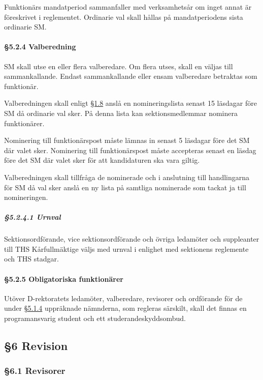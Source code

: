Funktionärs mandatperiod sammanfaller med verksamhetsår om inget annat är föreskrivet i reglementet. Ordinarie val skall hållas på mandatperiodens sista ordinarie SM.

\paragraph{§5.2.4 Valberedning}

SM skall utse en eller flera valberedare. Om flera utses, skall en väljas till
sammankallande. Endast sammankallande eller ensam valberedare betraktas som funktionär.

Valberedningen skall enligt \href{#officiella_informationskanaler}{§1.8} anslå en nomineringslista senast 15 läsdagar före SM då ordinarie val sker. På denna lista kan sektionsmedlemmar nominera funktionärer.

Nominering till funktionärspost måste lämnas in senast 5 läsdagar före det SM där valet sker. Nominering till funktionärspost måste accepteras senast en läsdag före det SM där valet sker för att kandidaturen ska vara giltig.

Valberedningen skall tillfråga de nominerade och i anslutning till handlingarna för SM då val sker anslå en ny lista på samtliga nominerade som tackat ja till nomineringen.

\subparagraph{§5.2.4.1 Urnval}

Sektionsordförande, vice sektionsordförande och övriga ledamöter och suppleanter till THS Kårfullmäktige väljs med urnval i enlighet med sektionens reglemente och THS stadgar.

\paragraph{§5.2.5 Obligatoriska funktionärer}

Utöver D-rektoratets ledamöter, valberedare, revisorer och ordförande för de under \href{#namnder}{§5.1.4} uppräknade nämnderna, som regleras särskilt, skall det finnas en programansvarig student och ett studerandeskyddsombud.

\subsection{§6 Revision}

\subsubsection{§6.1 Revisorer}

